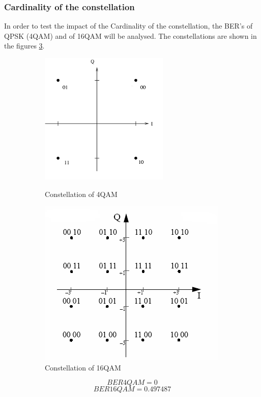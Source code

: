 \subsubsection*{Cardinality of the constellation}
In order to test the impact of the Cardinality of the constellation, the BER's of QPSK (4QAM) and of 16QAM will be analysed. The constellations are shown in the figures \ref{Constellation}.
\begin{figure}[H]
	\centering
        \begin{subfigure}{.55\textwidth}
        \centering
        	\includegraphics[scale=1]{./lib/m_qam_transmitter/figure_PLoureiro/4QAM_gray.png}
        \label{Example_4QAM_cons}\caption{Constellation of 4QAM}
        \end{subfigure}%
        \begin{subfigure}{.55\textwidth}
        \centering
        	\includegraphics[scale=0.8]{./lib/m_qam_transmitter/figure_PLoureiro/16QAM_cons.png}
        	\caption{Constellation of 16QAM}\label{Example_16QAM_cons}
        \end{subfigure}
        \caption{}\label{Constellation}
\end{figure}
\begin{equation*}
BER 4QAM = 0
\end{equation*}
\begin{equation*}
BER 16QAM = 0.497487
\end{equation*}

